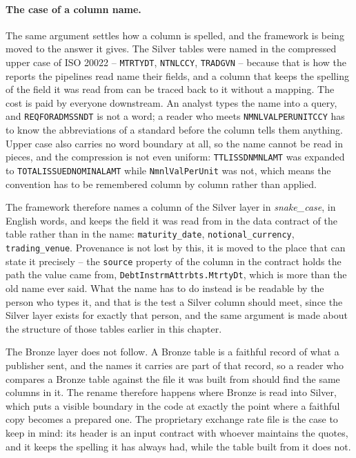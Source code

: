 \documentclass[a4paper, 11pt]{report}
\begin{document}
\paragraph{The case of a column name.} The same argument settles how a column is spelled, and the framework is being moved to the answer it gives. The Silver tables were named in the compressed upper case of ISO 20022 -- \verb|MTRTYDT|, \verb|NTNLCCY|, \verb|TRADGVN| -- because that is how the reports the pipelines read name their fields, and a column that keeps the spelling of the field it was read from can be traced back to it without a mapping. The cost is paid by everyone downstream. An analyst types the name into a query, and \verb|REQFORADMSSNDT| is not a word; a reader who meets \verb|NMNLVALPERUNITCCY| has to know the abbreviations of a standard before the column tells them anything. Upper case also carries no word boundary at all, so the name cannot be read in pieces, and the compression is not even uniform: \verb|TTLISSDNMNLAMT| was expanded to \verb|TOTALISSUEDNOMINALAMT| while \verb|NmnlValPerUnit| was not, which means the convention has to be remembered column by column rather than applied.

The framework therefore names a column of the Silver layer in \emph{snake\_case}, in English words, and keeps the field it was read from in the data contract of the table rather than in the name: \verb|maturity_date|, \verb|notional_currency|, \verb|trading_venue|. Provenance is not lost by this, it is moved to the place that can state it precisely -- the \verb|source| property of the column in the contract holds the path the value came from, \verb|DebtInstrmAttrbts.MtrtyDt|, which is more than the old name ever said. What the name has to do instead is be readable by the person who types it, and that is the test a Silver column should meet, since the Silver layer exists for exactly that person, and the same argument is made about the structure of those tables earlier in this chapter.

The Bronze layer does not follow. A Bronze table is a faithful record of what a publisher sent, and the names it carries are part of that record, so a reader who compares a Bronze table against the file it was built from should find the same columns in it. The rename therefore happens where Bronze is read into Silver, which puts a visible boundary in the code at exactly the point where a faithful copy becomes a prepared one. The proprietary exchange rate file is the case to keep in mind: its header is an input contract with whoever maintains the quotes, and it keeps the spelling it has always had, while the table built from it does not.
\end{document}
